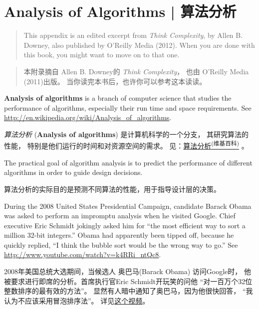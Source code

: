 \chapter{Analysis of Algorithms  |  算法分析}
\label{algorithms}

\begin{quote}
This appendix is an edited excerpt from {\it Think Complexity}, by
Allen B. Downey, also published by O'Reilly Media (2012).  When you
are done with this book, you might want to move on to that one.
\end{quote}

\begin{quote}
本附录摘自 Allen B. Downey的 {\em Think Complexity}， 也由 O’Reilly Media (2011)出版。 当你读完本书后，也许你可以参考这本读读。
\end{quote}

{\bf Analysis of algorithms} is a branch of computer science that
studies the performance of algorithms, especially their run time and
space requirements.  See
\url{http://en.wikipedia.org/wiki/Analysis_of_algorithms}.

{\em 算法分析} ({\bf Analysis of algorithms}) 是计算机科学的一个分支，
 其研究算法的性能， 特别是他们运行的时间和对资源空间的需求。
见：\href{http://en.wikipedia.org/wiki/Analysis_of_algorithms}{算法分析\textsuperscript{(维基百科)}} 。
 

The practical goal of algorithm analysis is to predict the performance
of different algorithms in order to guide design decisions.

算法分析的实际目的是预测不同算法的性能，用于指导设计层的决策。

During the 2008 United States Presidential Campaign, candidate
Barack Obama was asked to perform an impromptu analysis when
he visited Google.  Chief executive Eric Schmidt jokingly asked him
for ``the most efficient way to sort a million 32-bit integers.''
Obama had apparently been tipped off, because he quickly
replied, ``I think the bubble sort would be the wrong way to go.''
See \url{http://www.youtube.com/watch?v=k4RRi_ntQc8}.

2008年美国总统大选期间，当候选人 奥巴马(Barack Obama) 访问Google时，
他被要求进行即席的分析。首席执行官Eric Schmidt开玩笑的问他
``对一百万个32位整数排序的最有效的方法''。
显然有人暗中通知了奥巴马，因为他很快回答， ``我认为不应该采用冒泡排序法''。
详见\href{http://www.youtube.com/watch?v=k4RRi_ntQc8}{这个视频}。
    

